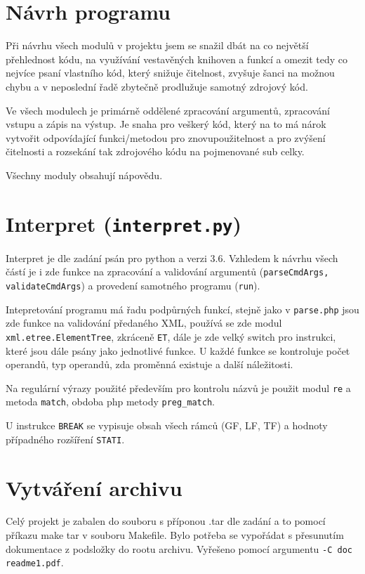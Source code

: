 \documentclass[a4paper,10pt]{article}
\begin{document}
\hfill

\section*{Návrh programu}
  Při návrhu všech modulů v projektu jsem se snažil dbát na co největší přehlednost kódu, na
  využívání vestavěných knihoven a funkcí a omezit tedy co nejvíce psaní vlastního kód, který snižuje
  čitelnost, zvyšuje šanci na možnou chybu a v neposlední řadě zbytečně prodlužuje samotný zdrojový kód.

  Ve všech modulech je primárně oddělené zpracování argumentů, zpracování vstupu a zápis na výstup.
  Je snaha pro veškerý kód, který na to má nárok vytvořit odpovídající funkci/metodou pro
  znovupoužitelnost a pro zvýšení čitelnosti a rozsekání tak zdrojového kódu na pojmenované sub celky.

  Všechny moduly obsahují nápovědu.

\section{Interpret (\texttt{interpret.py})}
  Interpret je dle zadání psán pro python a verzi 3.6. Vzhledem k návrhu všech částí je i zde funkce na zpracování a validování argumentů (\texttt{parseCmdArgs, validateCmdArgs}) a provedení samotného programu (\texttt{run}).

  Intepretování programu má řadu podpůrných funkcí, stejně jako v \texttt{parse.php} jsou zde funkce na validování předaného XML, používá se zde modul \texttt{xml.etree.ElementTree}, zkráceně \texttt{ET}, dále je zde velký switch pro instrukci, které jsou dále psány jako jednotlivé funkce. U každé funkce se kontroluje počet operandů, typ operandů, zda proměnná existuje a další náležitosti.

  Na regulární výrazy použité především pro kontrolu názvů je použit modul \texttt{re} a metoda \texttt{match}, obdoba php metody \texttt{preg\_match}.

  U instrukce \texttt{BREAK} se vypisuje obsah všech rámců (GF, LF, TF) a hodnoty případného rozšíření \texttt{STATI}.

\section{Vytváření archivu}
  Celý projekt je zabalen do souboru s příponou .tar dle zadání a to pomocí příkazu make tar v souboru Makefile.
  Bylo potřeba se vypořádat s přesunutím dokumentace z podsložky do rootu archivu. Vyřešeno pomocí argumentu \texttt{-C doc readme1.pdf}.

\nocite{*}




\newpage
\thispagestyle{empty}
\end{document}
